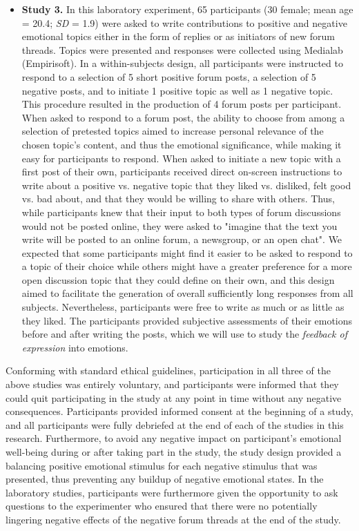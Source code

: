 \documentclass[nologo,url,11pt,a4paper]{ETHpaper}
\begin{document}
\begin{itemize}
\item \textbf{Study 3.} 
In this laboratory experiment, 65 participants (30 female; mean age = 20.4; \textit{SD} = 1.9) were asked to write contributions to positive and negative emotional topics either in the form of replies or as initiators of new forum threads. Topics were presented and responses were collected using Medialab (Empirisoft). In a within-subjects design, all participants were instructed to respond to a selection of 5 short positive forum posts, a selection of 5 negative posts, and to initiate 1 positive topic as well as 1 negative topic. This procedure resulted in the production of 4 forum posts per participant. When asked to respond to a forum post, the ability to choose from among a selection of pretested topics aimed to increase personal relevance of the chosen topic's content, and thus the emotional significance, while making it easy for participants to respond. When asked to initiate a new topic with a first post of their own, participants received direct on-screen instructions to write about a positive vs. negative topic that they liked vs. disliked, felt good vs. bad about, and that they would be willing to share with others. Thus, while participants knew that their input to both types of forum discussions would not be posted online, they were asked to "imagine that the text you write will be posted to an online forum, a newsgroup, or an open chat". We expected that some participants might find it easier to be asked to respond to a topic of their choice while others might have a greater preference for a more open discussion topic that they could define on their own, and this design aimed to facilitate the generation of overall sufficiently long responses from all subjects. Nevertheless, participants were free to write as much or as little as they liked.
The participants provided subjective assessments of their emotions before and after writing the posts, which we will use to study the \emph{feedback of expression} into emotions.

\end{itemize}

Conforming with standard ethical guidelines, participation in all three of the above studies was entirely voluntary, and participants were informed that they could quit participating in the study at any point in time without any negative consequences. Participants provided informed consent at the beginning of a study, and all participants were fully debriefed at the end of each of the  studies in this research. Furthermore, to avoid any negative impact on participant's emotional well-being during or after taking part in the study, the study design provided a balancing positive emotional stimulus for each negative stimulus that was presented, thus preventing any buildup of negative emotional states. In the laboratory studies, participants were furthermore given the opportunity to ask questions to the experimenter who ensured that there were no potentially lingering negative effects of the negative forum threads at the end of the study.
\end{document}
